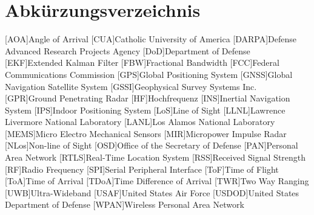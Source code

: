 \chapter*{Abkürzungsverzeichnis}
\begin{acronym}
		
	[AOA]{Angle of Arrival}
	[CUA]{Catholic University of America}
	[DARPA]{Defense Advanced Research Projects Agency}
	[DoD]{Department of Defense}
	[EKF]{Extended Kalman Filter}
	[FBW]{Fractional Bandwidth}
	[FCC]{Federal Communications Commission}
	[GPS]{Global Positioning System}
	[GNSS]{Global Navigation Satellite System}
	[GSSI]{Geophysical Survey Systems Inc.}
	[GPR]{Ground Penetrating Radar}
	[HF]{Hochfrequenz}
	[INS]{Inertial Navigation System}
	[IPS]{Indoor Positioning System}
	[LoS]{Line of Sight}
	[LLNL]{Lawrence Livermore National Laboratory}
	[LANL]{Los Alamos National Laboratory}
	[MEMS]{Micro Electro Mechanical Sensors}
	[MIR]{Micropower Impulse Radar}
	[NLos]{Non-line of Sight}
	[OSD]{Office of the Secretary of Defense}
	[PAN]{Personal Area Network}
	[RTLS]{Real-Time Location System}
	[RSS]{Received Signal Strength}
	[RF]{Radio Frequency}
	[SPI]{Serial Peripheral Interface}
	[ToF]{Time of Flight}
	[ToA]{Time of Arrival}
	[TDoA]{Time Difference of Arrival}
	[TWR]{Two Way Ranging}
	[UWB]{Ultra-Wideband} %
	[USAF]{United States Air Force}
	[USDOD]{United States Department of Defense} %
	[WPAN]{Wireless Personal Area Network}

\end{acronym}